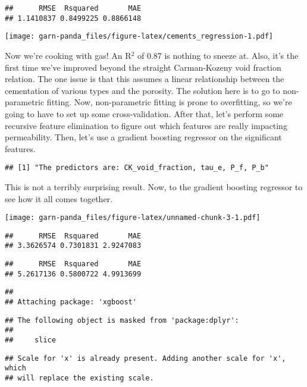 \documentclass[]{article}
\begin{document}
\begin{verbatim}
##      RMSE  Rsquared       MAE 
## 1.1410837 0.8499225 0.8866148
\end{verbatim}

\texttt{[image: garn-panda\_files/figure-latex/cements\_regression-1.pdf]}

Now we're cooking with gas! An R\(^2\) of 0.87 is nothing to sneeze at.
Also, it's the first time we've improved beyond the straight
Carman-Kozeny void fraction relation. The one issue is that this assumes
a linear relationship between the cementation of various types and the
porosity. The solution here is to go to non-parametric fitting. Now,
non-parametric fitting is prone to overfitting, so we're going to have
to set up some cross-validation. After that, let's perform some
recursive feature elimination to figure out which features are really
impacting permeability. Then, let's use a gradient boosting regressor on
the significant features.

\begin{verbatim}
## [1] "The predictors are: CK_void_fraction, tau_e, P_f, P_b"
\end{verbatim}

This is not a terribly surprising result. Now, to the gradient boosting
regressor to see how it all comes together.

\texttt{[image: garn-panda\_files/figure-latex/unnamed-chunk-3-1.pdf]}

\begin{verbatim}
##      RMSE  Rsquared       MAE 
## 3.3626574 0.7301831 2.9247083
\end{verbatim}

\begin{verbatim}
##      RMSE  Rsquared       MAE 
## 5.2617136 0.5800722 4.9913699
\end{verbatim}

\begin{verbatim}
## 
## Attaching package: 'xgboost'
\end{verbatim}

\begin{verbatim}
## The following object is masked from 'package:dplyr':
## 
##     slice
\end{verbatim}

\begin{verbatim}
## Scale for 'x' is already present. Adding another scale for 'x', which
## will replace the existing scale.
\end{verbatim}
\end{document}
